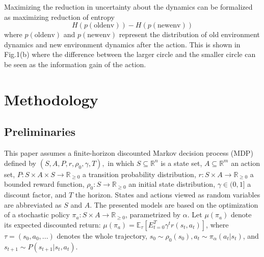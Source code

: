\documentclass{article}
\begin{document}
	\noindent Maximizing the reduction in uncertainty about the dynamics can be formalized as maximizing reduction of entropy
	\begin{equation}
	H(p(\text{oldenv})) - H(p(\text{newenv}))
	\end{equation}
	where $p(\text{oldenv})$ and $p(\text{newenv})$ represent the distribution of old environment dynamics and new environment dynamics after the action. This is shown in Fig.1(b) where the difference between the larger circle and the smaller circle can be seen as the information gain of the action.
	\section{Methodology}
	\subsection{Preliminaries}
	\noindent This paper assumes a finite-horizon discounted Markov decision process (MDP) defined by  $(S,A,P,r,\rho_0,\gamma,T),$ in which $S\subseteq\mathds{R}^n$ is a state set, $A\subseteq\mathds{R}^m$ an action set, $P:S\times A\times S \rightarrow \mathds{R}_{\geq0}$ a transition probability distribution, $r:S\times A \rightarrow \mathds{R}_{\geq0}$ a bounded reward function, $\rho_0: S\rightarrow\mathds{R}_{\geq0}$ an initial state distribution, $\gamma\in(0,1]$ a discount factor, and $T$ the horizon. States and actions viewed as random variables are abbreviated as $S$ and $A$. The presented models are based on the optimization of a stochastic policy $\pi_a: S\times A\rightarrow \mathds{R}_{\geq 0}$, parametrized by $\alpha$. Let $\mu(\pi_a)$ denote its expected discounted return: $\mu(\pi_a) = \mathds{E}_{\tau}[E_{t=0}^T\gamma^tr(s_t,a_t)]$, where $\tau = (s_0,a_0,...)$ denotes the whole trajectory, $s_0\sim\rho_0(s_0),a_t\sim\pi_{\alpha}(a_t|s_t)$, and $s_{t+1}\sim P(s_{t+1}|s_t,a_t)$.
\end{document}
